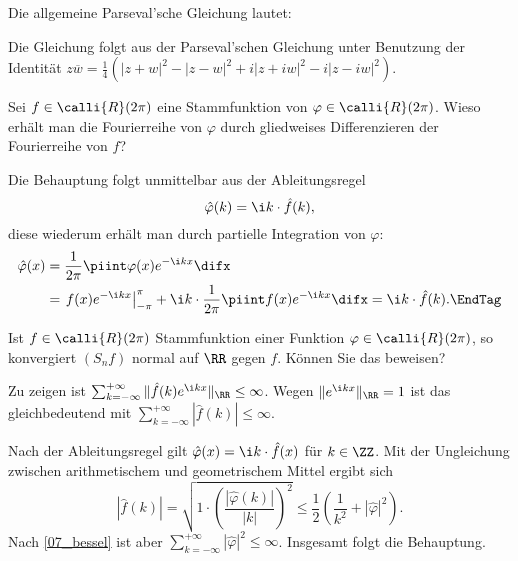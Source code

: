   \begin{antwort}
    Die allgemeine Parseval'sche 
    Gleichung lautet: 

    \medskip
    \noindent{}
    \noindent
    Die Gleichung folgt aus der Parseval'schen Gleichung 
    unter Benutzung der Identität 
    $z\overline{w}=\frac{1}{4}\left( |z+w|^2-|z-w|^2+i|z+iw|^2 - i|z-iw|^2\right)$.
    \AntEnd
  \end{antwort}

  \begin{frage}
    Sei $f\in\calli{R}(2\pi)$ eine Stammfunktion von 
    $\varphi\in\calli{R}(2\pi)$. 
    Wieso erhält man die Fourierreihe von $\varphi$ durch gliedweises 
    Differenzieren der Fourierreihe von $f$?
  \end{frage}

  \begin{antwort}
    Die Behauptung folgt unmittelbar aus der Ableitungsregel
    \[
    \hat{\varphi}(k)=\i k\cdot \hat{f}(k),
    \]
    diese wiederum erhält man durch partielle Integration von $\varphi$:
    \begin{align}
      \hat{\varphi}(x) &=
      \frac{1}{2\pi}\piint \varphi(x)e^{-\i kx}\difx \notag \\
      &=
      \left.f(x)e^{-\i kx}\right|_{-\pi}^\pi +
      \i k\cdot \frac{1}{2\pi}\piint f(x)e^{-\i kx}\difx 
      = \i k\cdot \hat{f}(k). \EndTag
    \end{align}
  \end{antwort}

  \begin{frage}
    Ist $f\in\calli{R}(2\pi)$ Stammfunktion 
    einer Funktion $\varphi\in\calli{R}(2\pi)$,
    so konvergiert $(S_nf)$ normal auf $\RR$ gegen $f$. Können Sie 
    das beweisen?
  \end{frage}

  \begin{antwort}
    Zu zeigen ist $
    \sum_{k=-\infty}^{+\infty} \| \hat{f}(k)e^{\i kx} \|_\RR\le \infty$. 
    Wegen $\|e^{\i kx}\|_\RR=1$ ist das gleichbedeutend mit 
    $\sum_{k=-\infty}^{+\infty} |\hat{f}(k)|  \le \infty$.

    Nach der Ableitungsregel gilt $\hat{\varphi}(x)=\i k\cdot \hat{f}(x)$ für 
    $k\in\ZZ$. Mit der Ungleichung zwischen arithmetischem und geometrischem  
    Mittel ergibt sich
    \[
    |\hat{f}(k)|=\sqrt{1\cdot\left(\frac{|\hat{\varphi}(k)|}{|k|}\right)^2}
    \le \frac{1}{2}\left( \frac{1}{k^2}+ |\hat{\varphi}|^2 \right).
    \]
    Nach \ref{07_bessel} ist aber 
    $\sum_{k=-\infty}^{+\infty}|\hat{\varphi}|^2\le\infty$. 
    Insgesamt folgt die Behauptung. \AntEnd
  \end{antwort}

